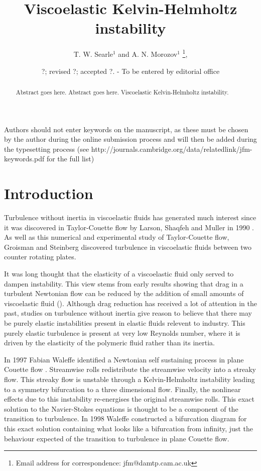 \documentclass{jfm}
\title[Viscoelastic Kelvin-Helmholtz instabilty]{Viscoelastic Kelvin-Helmholtz instability}
\author[T. W. Searle and A. N. Morozov]%
{T. W. Searle$^1$ and A. N. Morozov$^1$%
  \thanks{Email address for correspondence: jfm@damtp.cam.ac.uk},\ns
}
\affiliation{$^1$SUPA, School of Physics and Astronomy, University of Edinburgh, Mayfield Road,
Edinburgh, EH9 3JZ, UK\\[\affilskip]
}
\date{?; revised ?; accepted ?. - To be entered by editorial office}
\begin{document}
\maketitle

\begin{abstract}
  Abstract goes here. Abstract goes here. Viscoelastic Kelvin-Helmholtz instability. 
\end{abstract}

\begin{keywords}
Authors should not enter keywords on the manuscript, as these must be chosen by
the author during the online submission process and will then be added during
the typesetting process (see
http://journals.cambridge.org/data/\linebreak[3]relatedlink/jfm-\linebreak[3]keywords.pdf
for the full list)
\end{keywords}

\section{Introduction}

Turbulence without inertia in viscoelastic fluids has generated much interest
since it was discovered in Taylor-Couette flow by Larson, Shaqfeh and Muller in
1990 \cite{Larson1990}. As well as this numerical and experimental study of
Taylor-Couette flow, Groisman and Steinberg \cite{Groisman2000} discovered
turbulence in viscoelastic fluids between two counter rotating plates.

It was long thought that the elasticity of a viscoelastic fluid only served to
dampen instability. This view stems from early results showing that drag in a
turbulent Newtonian flow can be reduced by the addition of small amounts of
viscoelastic fluid (\cite{Toms1977}). Although drag reduction has received a
lot of attention in the past, studies on turbulence without inertia give reason
to believe that there may be purely elastic instabilities present in elastic
fluids relevent to industry.  This purely elastic turbulence is present at very
low Reynolds number, where it is driven by the elasticity of the polymeric
fluid rather than its inertia.

In 1997 Fabian Waleffe identified a Newtonian self sustaining process in plane
Couette flow \cite{Waleffe1997}. Streamwise rolls redistribute the streamwise
velocity into a streaky flow. This streaky flow is unstable through a
Kelvin-Helmholtz instability leading to a symmetry bifurcation to a three
dimensional flow. Finally, the nonlinear effects due to this instability
re-energises the original streamwise rolls. This exact solution to the
Navier-Stokes equations is thought to be a component of the transition to
turbulence. In 1998 Waleffe constructed a bifurcation diagram for this exact
solution \cite{Waleffe1998} containing what looks like a bifurcation from
infinity, just the behaviour expected of the transition to turbulence in plane
Couette flow.
\end{document}

